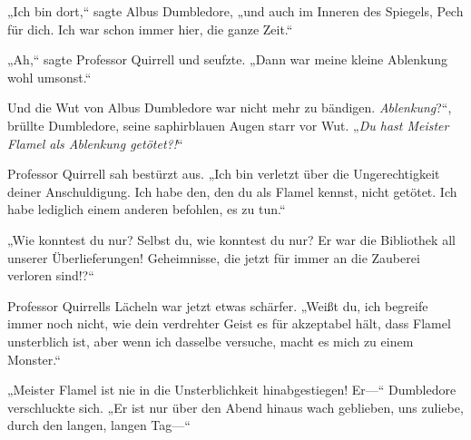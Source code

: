„Ich bin dort,“ sagte Albus Dumbledore, „und auch im Inneren des Spiegels, Pech für dich. Ich war schon immer hier, die ganze Zeit.“

„Ah,“ sagte Professor Quirrell und seufzte. „Dann war meine kleine Ablenkung wohl umsonst.“

Und die Wut von Albus Dumbledore war nicht mehr zu bändigen.
\emph{Ablenkung}?“, brüllte Dumbledore, seine saphirblauen Augen starr vor Wut. „\emph{Du hast Meister Flamel als Ablenkung getötet?!}“

Professor Quirrell sah bestürzt aus. „Ich bin verletzt über die Ungerechtigkeit deiner Anschuldigung. Ich habe den, den du als Flamel kennst, nicht getötet. Ich habe lediglich einem anderen befohlen, es zu tun.“

„Wie konntest du nur? Selbst du, wie konntest du nur? Er war die Bibliothek all unserer Überlieferungen! Geheimnisse, die jetzt für immer an die Zauberei verloren sind!?“

Professor Quirrells Lächeln war jetzt etwas schärfer. „Weißt du, ich begreife immer noch nicht, wie dein verdrehter Geist es für akzeptabel hält, dass Flamel unsterblich ist, aber wenn ich dasselbe versuche, macht es mich zu einem Monster.“

„Meister Flamel ist nie in die Unsterblichkeit hinabgestiegen! Er—“ Dumbledore verschluckte sich. „Er ist nur über den Abend hinaus wach geblieben, uns zuliebe, durch den langen, langen Tag—“

